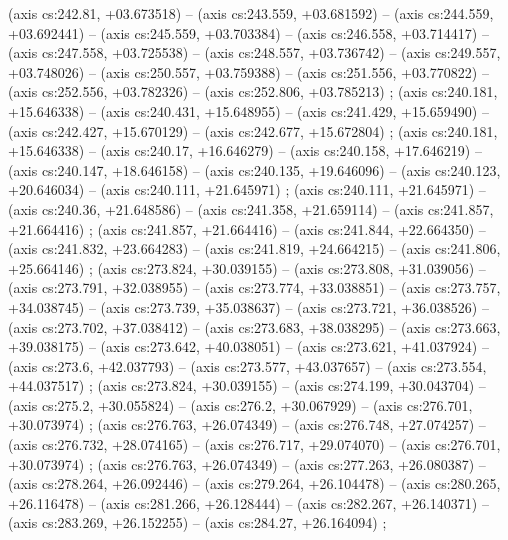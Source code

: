     (axis cs:242.81,    +03.673518) --  (axis cs:243.559,    +03.681592) --  (axis cs:244.559,    +03.692441) --  (axis cs:245.559,    +03.703384) --  (axis cs:246.558,    +03.714417) --  (axis cs:247.558,    +03.725538) --  (axis cs:248.557,    +03.736742) --  (axis cs:249.557,    +03.748026) --  (axis cs:250.557,    +03.759388) --  (axis cs:251.556,    +03.770822) --  (axis cs:252.556,    +03.782326) --  (axis cs:252.806,    +03.785213) ;
    (axis cs:240.181,    +15.646338) --  (axis cs:240.431,    +15.648955) --  (axis cs:241.429,    +15.659490) --  (axis cs:242.427,    +15.670129) --  (axis cs:242.677,    +15.672804) ;
    (axis cs:240.181,    +15.646338) --  (axis cs:240.17,    +16.646279) --  (axis cs:240.158,    +17.646219) --  (axis cs:240.147,    +18.646158) --  (axis cs:240.135,    +19.646096) --  (axis cs:240.123,    +20.646034) --  (axis cs:240.111,    +21.645971) ;
    (axis cs:240.111,    +21.645971) --  (axis cs:240.36,    +21.648586) --  (axis cs:241.358,    +21.659114) --  (axis cs:241.857,    +21.664416) ;
    (axis cs:241.857,    +21.664416) --  (axis cs:241.844,    +22.664350) --  (axis cs:241.832,    +23.664283) --  (axis cs:241.819,    +24.664215) --  (axis cs:241.806,    +25.664146) ;
    (axis cs:273.824,    +30.039155) --  (axis cs:273.808,    +31.039056) --  (axis cs:273.791,    +32.038955) --  (axis cs:273.774,    +33.038851) --  (axis cs:273.757,    +34.038745) --  (axis cs:273.739,    +35.038637) --  (axis cs:273.721,    +36.038526) --  (axis cs:273.702,    +37.038412) --  (axis cs:273.683,    +38.038295) --  (axis cs:273.663,    +39.038175) --  (axis cs:273.642,    +40.038051) --  (axis cs:273.621,    +41.037924) --  (axis cs:273.6,    +42.037793) --  (axis cs:273.577,    +43.037657) --  (axis cs:273.554,    +44.037517) ;
    (axis cs:273.824,    +30.039155) --  (axis cs:274.199,    +30.043704) --  (axis cs:275.2,    +30.055824) --  (axis cs:276.2,    +30.067929) --  (axis cs:276.701,    +30.073974) ;
    (axis cs:276.763,    +26.074349) --  (axis cs:276.748,    +27.074257) --  (axis cs:276.732,    +28.074165) --  (axis cs:276.717,    +29.074070) --  (axis cs:276.701,    +30.073974) ;
    (axis cs:276.763,    +26.074349) --  (axis cs:277.263,    +26.080387) --  (axis cs:278.264,    +26.092446) --  (axis cs:279.264,    +26.104478) --  (axis cs:280.265,    +26.116478) --  (axis cs:281.266,    +26.128444) --  (axis cs:282.267,    +26.140371) --  (axis cs:283.269,    +26.152255) --  (axis cs:284.27,    +26.164094) ;
